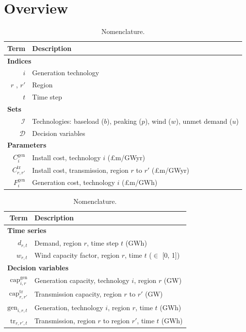 \documentclass[preprint]{elsarticle}
\begin{document}
\section{Overview}

\begin{table}
  \centering
  \small
\begin{tabular}{r p{5.3cm}}
  Term & Description \\ \hline
  \multicolumn{2}{l}{\textbf{Indices}} \\
  $i$ & Generation technology \\
  $r$ , $r'$ & Region \\
  $t$ & Time step \\
  \multicolumn{2}{l}{\textbf{Sets}} \\
  $\mathcal{I}$ & Technologies: baseload ($b$), peaking ($p$), wind ($w$), unmet demand ($u$) \\
  $\mathcal{D}$ & Decision variables \\
  \multicolumn{2}{l}{\textbf{Parameters}} \\
  $C_{i}^\text{gen}$ & Install cost, technology $i$ (\pounds m/GWyr)\\
  $C_{r, r'}^\text{tr}$ & Install cost, transmission, region $r$ to $r'$ (\pounds m/GWyr) \\
  $F_{i}^\text{gen}$ & Generation cost, technology $i$ (\pounds m/GWh) \\ \hline
\end{tabular} \hspace{0.5em}
\begin{tabular}{r p{3.7cm}}
  Term & Description \\ \hline
  \multicolumn{2}{l}{\textbf{Time series}} \\
  $d_{r, t}$ & Demand, region $r$, time step $t$ (GWh) \\
  $w_{r, t}$ & Wind capacity factor, region $r$, time $t$ ($\in$ [0, 1]) \\
  \multicolumn{2}{l}{\textbf{Decision variables}} \\
  $\text{cap}_{i, r}^\text{gen}$ & Generation capacity, technology $i$, region $r$ (GW) \\
  $\text{cap}_{r, r'}^\text{tr}$ & Transmission capacity, region $r$ to $r'$ (GW) \\
  $\text{gen}_{i, r, t}$ & Generation, technology $i$, region $r$, time $t$ (GWh) \\
  $\text{tr}_{r, r', t}$ & Transmission, region $r$ to region $r'$, time $t$ (GWh) \\ \hline
\end{tabular}
\caption{Nomenclature.}
\label{table:appendix:nomenclature}
\end{table}
\end{document}
